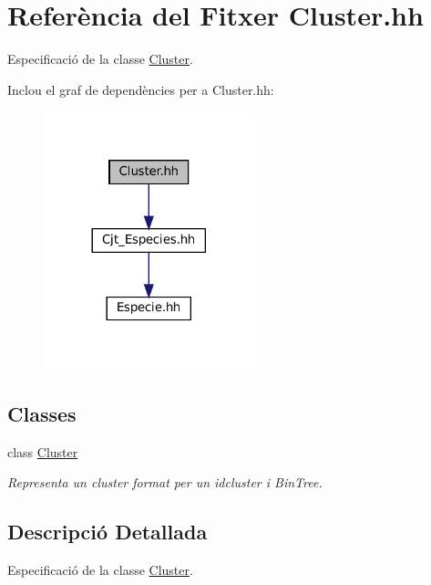 \hypertarget{_cluster_8hh}{}\section{Referència del Fitxer Cluster.\+hh}
\label{_cluster_8hh}


Especificació de la classe \hyperlink{class_cluster}{Cluster}.  


Inclou el graf de dependències per a Cluster.\+hh\+:
\nopagebreak
\begin{figure}[H]
\begin{center}
\leavevmode
\includegraphics[width=173pt]{_cluster_8hh__incl}
\end{center}
\end{figure}
\subsection*{Classes}
\begin{DoxyCompactItemize}
\item 
class \hyperlink{class_cluster}{Cluster}
\begin{DoxyCompactList}\small\item\em Representa un cluster format per un idcluster i Bin\+Tree. \end{DoxyCompactList}\end{DoxyCompactItemize}


\subsection{Descripció Detallada}
Especificació de la classe \hyperlink{class_cluster}{Cluster}. 

